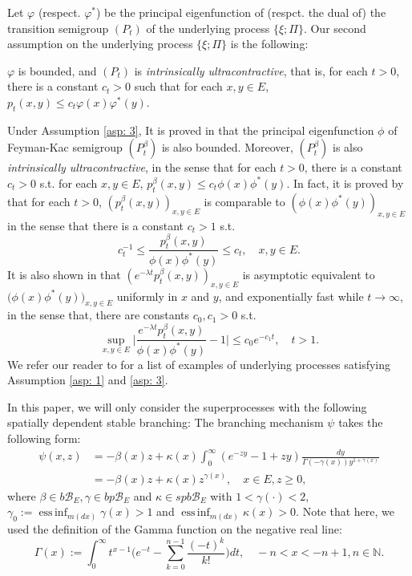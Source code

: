 \documentclass[12pt, a4paper]{amsart}
\theoremstyle{definition}
\newenvironment{asp}[1]{\renewcommand\theinnerasp{#1}\innerasp}{\endinnerasp}
\numberwithin{equation}{section}
\begin{document}
	Let $\varphi$ (respect. $\varphi^*$) be the principal eigenfunction of (respct. the dual of) the transition semigroup $(P_t)$ of the underlying process $\{\xi;\Pi\}$. Our second assumption on the underlying process $\{\xi; \Pi\}$ is the following:

\begin{asp}{3} \label{asp: 3}
	$\varphi$ is bounded, and $(P_t)$ is \emph{intrinsically ultracontractive}, that is, for each $t>0$, there is a constant $c_t >0$ such that for each $x,y\in E$, $p_t(x,y) \leq c_t \varphi(x) \varphi^*(y)$.
\end{asp}
	
	Under Assumption \ref{asp: 3},	It is proved in \cite{RenSongZhang2017Central,RenSongZhang2015Limit} that the principal eigenfunction $\phi$ of Feyman-Kac semigroup $(P^\beta_t)$ is also bounded.
	Moreover, $(P^\beta_t)$ is also \emph{intrinsically ultracontractive}, in the sense that for each $t>0$, there is a constant $c_t >0$ s.t. for each $x,y\in E$, $p^\beta_t(x,y) \leq c_t \phi(x) \phi^*(y)$.
	In fact, it is proved by \cite{KimSong2008Intrinsic} that for each $t>0$, $(p^\beta_t(x,y))_{x,y\in E}$ is comparable to $(\phi(x)\phi^*(y))_{x,y\in E}$ in the sense that there is a constant $c_t > 1$ s.t. 
\[\label{eq: p-t-beta is comparable to phi phi-star}
	c_t^{-1}
	\leq \frac {p^\beta_t(x,y)} {\phi(x)\phi^*(y)}  
	\leq c_t,
	\quad x,y \in E.
\]
	It is also shown in \cite{KimSong2008Intrinsic} that $(e^{-\lambda t}p^\beta_t(x,y))_{x,y\in E}$ is asymptotic equivalent to $\big(\phi(x)\phi^*(y)\big)_{x,y\in E}$ uniformly in $x$ and $y$, and exponentially fast while $t\to \infty$, in the sense that, there are constants $c_0,c_1 > 0$ s.t. 
\[\label{eq:q(t,x,y)}
	\sup_{x,y\in E} \big|\frac{e^{-\lambda t}p^\beta_t(x,y)}{\phi(x)\phi^*(y)} - 1 \big| \leq c_0 e^{-c_1 t},
	\quad t > 1.
\]
	We refer our reader to \cite{RenSongZhang2015Limit} for a list of examples of underlying processes satisfying Assumption \ref{asp: 1} and \ref{asp: 3}.

	In this paper, we will only consider the superprocesses with the following spatially dependent stable branching:
\begin{asp}{4} \label{asp: 4}
	The branching mechanism $\psi$ takes the following form:
\[\begin{split}
	\psi(x,z) 
	&= - \beta(x) z + \kappa(x) \int_0^\infty (e^{-z y} - 1+ z y) \frac{dy}{\Gamma(- \gamma(x)) y^{1+ \gamma(x)}}
	\\&= -\beta (x) z + \kappa(x) z^{\gamma(x)},
	\quad x\in E, z \geq 0,
\end{split}\]
	where $\beta \in b\mathscr B_E, \gamma \in bp\mathscr B_E$ and $\kappa \in spb\mathscr B_E$ with $1< \gamma(\cdot )<2$, $\gamma_0 := \operatorname{ess\,inf}_{m(dx)} \gamma(x)> 1$ and $\operatorname{ess\,inf}_{m(dx)}\kappa(x) > 0$.
\end{asp}
	Note that here, we used the definition of the Gamma function on the negative real line:
\[\label{eq: definition of Gamma function}
	\Gamma(x) 
	:= \int_0^\infty t^{x-1} \Big(e^{-t} - \sum_{k=0}^{n-1} \frac{(-t)^k}{k!}\Big) dt, 
	\quad -n< x< -n+1, n\in \mathbb N.
\]
	
\end{document}
